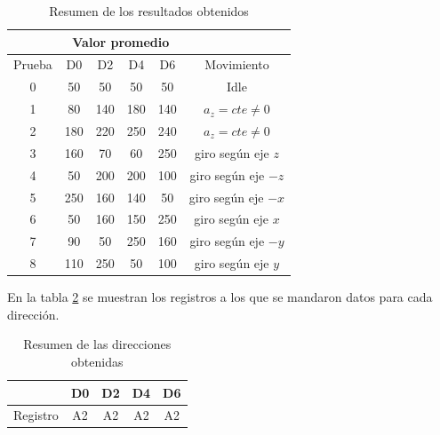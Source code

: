 \documentclass[main]{subfiles}
\begin{document}
\begin{table}[H]
\begin{center}
\begin{tabular}{c|c|c|c|c|c|} 
\cline{2-5}
& \multicolumn{4}{c|}{\cellcolor[gray]{0.8} Valor promedio} \\ \hline
\multicolumn{1}{|c|}{\cellcolor[gray]{0.8} Prueba} & \cellcolor[gray]{0.8} D0 & \cellcolor[gray]{0.8} D2 & \cellcolor[gray]{0.8} D4 & \cellcolor[gray]{0.8} D6 & \cellcolor[gray]{0.8} Movimiento \\ \hline
\multicolumn{1}{|c|}{\cellcolor[gray]{0.8}0} & 50 & 50 & 50 & 50 & Idle \\ \hline
\multicolumn{1}{|c|}{\cellcolor[gray]{0.8}1} & 80 & 140 & 180 & 140 & $a_z=cte\neq 0$\\ \hline
\multicolumn{1}{|c|}{\cellcolor[gray]{0.8}2} & 180 & 220 & 250 & 240 & $a_z=cte\neq 0$ \\ \hline \hline
\multicolumn{1}{|c|}{\cellcolor[gray]{0.8}3} & 160 & 70 & 60 & 250 & giro seg\'un eje $z$ \\ \hline
\multicolumn{1}{|c|}{\cellcolor[gray]{0.8}4} & 50 & 200 & 200 & 100 & giro seg\'un eje $-z$\\ \hline \hline
\multicolumn{1}{|c|}{\cellcolor[gray]{0.8}5} & 250 & 160 & 140 & 50 & giro seg\'un eje $-x$\\ \hline
\multicolumn{1}{|c|}{\cellcolor[gray]{0.8}6} & 50 & 160 & 150 & 250 & giro seg\'un eje $x$ \\ \hline
\multicolumn{1}{|c|}{\cellcolor[gray]{0.8}7} & 90 & 50 & 250 & 160 & giro seg\'un eje $-y$\\ \hline
\multicolumn{1}{|c|}{\cellcolor[gray]{0.8}8} & 110 & 250 & 50 &  100 & giro seg\'un eje $y$\\ \hline
\end{tabular} 
\caption{Resumen de los resultados obtenidos}
\label{tab:resumen_snif}
\end{center}
\end{table}

En la tabla \ref{tab:resumen_snif_add} se muestran los registros a los que se mandaron datos para cada dirección.

\begin{table}[H]
\begin{center}
\begin{tabular}{c|c|c|c|c|} 
\cline{2-5}
& \cellcolor[gray]{0.8} D0 & \cellcolor[gray]{0.8} D2 & \cellcolor[gray]{0.8} D4 & \cellcolor[gray]{0.8} D6 \\ \hline
\multicolumn{1}{|c|}{\cellcolor[gray]{0.8}Registro} & A2 & A2 & A2 & A2\\ \hline
\end{tabular} 
\caption{Resumen de las direcciones obtenidas}
\label{tab:resumen_snif_add}
\end{center}
\end{table}
\end{document}
